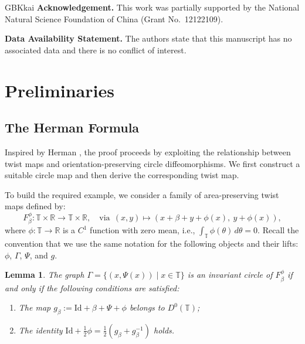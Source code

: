 \documentclass{amsart}
\newtheorem{Proposition}[Definition]{Proposition}
\newtheorem{Lemma}[Definition]{Lemma}
\theoremstyle{definition}
\begin{document}
\begin{CJK*}{GBK}{kai}
 \noindent\textbf{Acknowledgement.}
 This work was partially supported by the National Natural Science Foundation of China (Grant No.~12122109).

\vspace{1ex}

\noindent\textbf{Data Availability Statement.}
		The authors state that this manuscript has no associated data and there is no conflict of interest.
		

	\vspace{1em}	
			\section{\sc Preliminaries}
		


\subsection{The Herman Formula}Inspired by Herman \cite{H1}, the proof proceeds by exploiting the relationship between  twist maps and orientation-preserving circle diffeomorphisms. We first construct a suitable circle map and then derive the corresponding twist map.

To build the required example, we consider a family of area-preserving twist maps defined by:
\begin{equation}\label{deF}
F_\beta^\phi : \mathbb{T} \times \mathbb{R} \to \mathbb{T} \times \mathbb{R}, \quad\mathrm{via}\ \ (x, y) \mapsto \left(x + \beta + y + \phi(x),\ y + \phi(x)\right),
\end{equation}
where $\phi : \mathbb{T} \to \mathbb{R}$ is a $C^1$ function with zero mean, i.e., $\int_{\mathbb{T}} \phi(\theta)\,d\theta = 0$. Recall the convention that we use the same notation for the following objects and their lifts: $\phi$, $\Gamma$, $\Psi$, and $g$.

\begin{Lemma}\label{herob}
The graph $\Gamma = \{(x, \Psi(x)) \mid x \in \mathbb{T}\}$ is an invariant circle of $F_\beta^\phi$ if and only if the following conditions are satisfied:
\begin{enumerate}
    \item[(1)] The map $g_\beta := \mathrm{Id} + \beta + \Psi + \phi$ belongs to $D^0(\mathbb{T})$;
    \item[(2)] The identity $\mathrm{Id} + \frac{1}{2}\phi = \frac{1}{2}\left(g_\beta + g_\beta^{-1}\right)$ holds.
\end{enumerate}
\end{Lemma}


\end{CJK*}
\end{document}
